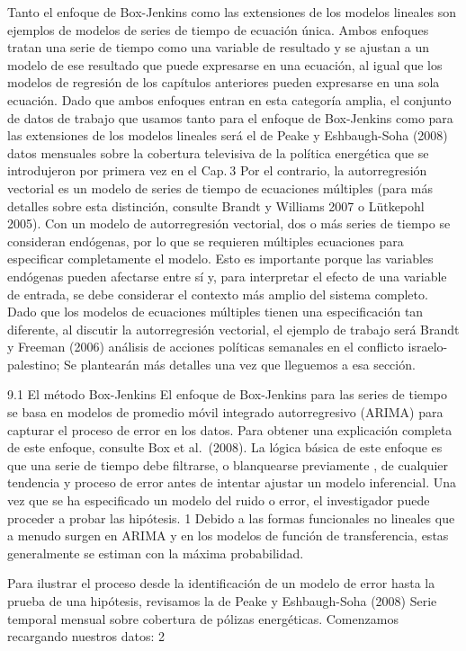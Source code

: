 \documentclass[
]{book}
\begin{document}
Tanto el enfoque de Box-Jenkins como las extensiones de los modelos lineales son ejemplos de modelos de series de tiempo de ecuación única. Ambos enfoques tratan una serie de tiempo como una variable de resultado y se ajustan a un modelo de ese resultado que puede expresarse en una ecuación, al igual que los modelos de regresión de los capítulos anteriores pueden expresarse en una sola ecuación. Dado que ambos enfoques entran en esta categoría amplia, el conjunto de datos de trabajo que usamos tanto para el enfoque de Box-Jenkins como para las extensiones de los modelos lineales será el de Peake y Eshbaugh-Soha (2008) datos mensuales sobre la cobertura televisiva de la política energética que se introdujeron por primera vez en el Cap. 3 Por el contrario, la autorregresión vectorial es un modelo de series de tiempo de ecuaciones múltiples (para más detalles sobre esta distinción, consulte Brandt y Williams 2007 o Lütkepohl 2005). Con un modelo de autorregresión vectorial, dos o más series de tiempo se consideran endógenas, por lo que se requieren múltiples ecuaciones para especificar completamente el modelo. Esto es importante porque las variables endógenas pueden afectarse entre sí y, para interpretar el efecto de una variable de entrada, se debe considerar el contexto más amplio del sistema completo. Dado que los modelos de ecuaciones múltiples tienen una especificación tan diferente, al discutir la autorregresión vectorial, el ejemplo de trabajo será Brandt y Freeman (2006) análisis de acciones políticas semanales en el conflicto israelo-palestino; Se plantearán más detalles una vez que lleguemos a esa sección.

9.1 El método Box-Jenkins
El enfoque de Box-Jenkins para las series de tiempo se basa en modelos de promedio móvil integrado autorregresivo (ARIMA) para capturar el proceso de error en los datos. Para obtener una explicación completa de este enfoque, consulte Box et al.~(2008). La lógica básica de este enfoque es que una serie de tiempo debe filtrarse, o blanquearse previamente , de cualquier tendencia y proceso de error antes de intentar ajustar un modelo inferencial. Una vez que se ha especificado un modelo del ruido o error, el investigador puede proceder a probar las hipótesis. 1 Debido a las formas funcionales no lineales que a menudo surgen en ARIMA y en los modelos de función de transferencia, estas generalmente se estiman con la máxima probabilidad.

Para ilustrar el proceso desde la identificación de un modelo de error hasta la prueba de una hipótesis, revisamos la de Peake y Eshbaugh-Soha (2008) Serie temporal mensual sobre cobertura de pólizas energéticas. Comenzamos recargando nuestros datos: 2
\end{document}
